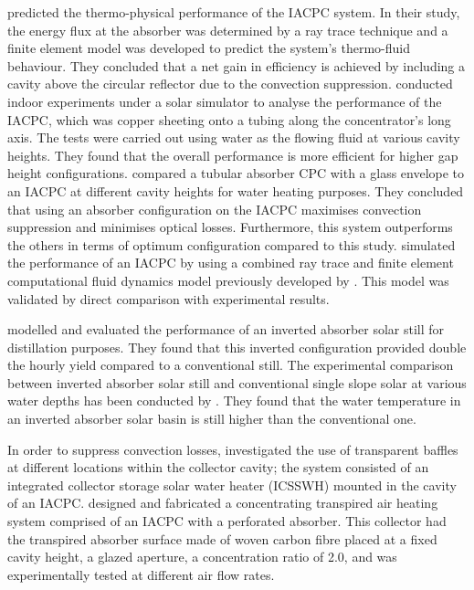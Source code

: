 \citet{Eames1996} predicted the thermo-physical performance of the IACPC system. In their study, the energy flux at the absorber was determined by a ray trace technique and a finite element model was developed to predict the system's thermo-fluid behaviour. They concluded that a net gain in efficiency is achieved by including a cavity above the circular reflector due to the convection suppression.
\citet{Kothdiwala1997} conducted indoor experiments under a solar simulator to analyse the performance of the IACPC, which was copper sheeting onto a tubing along the concentrator's long axis. The tests were carried out using water as the flowing fluid at various cavity heights. They found that the overall performance is more efficient for higher gap height configurations.
\citet{Kothdiwala1999} compared a tubular absorber CPC with a glass envelope to an IACPC at different cavity heights for water heating purposes. They concluded that using an absorber configuration on the IACPC maximises convection suppression and minimises optical losses. Furthermore, this system outperforms the others in terms of optimum configuration compared to this study.
\citet{Eames2001} simulated the performance of an IACPC by using a combined ray trace and finite element computational fluid dynamics model previously developed by \citet{Eames1993a}. This model was validated by direct comparison with experimental results.

\citet{Tiwari1998} modelled and evaluated the performance of an inverted absorber solar still for distillation purposes. They found that this inverted configuration provided double the hourly yield compared to a conventional still. The experimental comparison between inverted absorber solar still and conventional single slope solar at various water depths has been conducted by \citet{Dev2011}. They found that the water temperature in an inverted absorber solar basin is still higher than the conventional one.

In order to suppress convection losses, \citet{Smyth2005} investigated the use of transparent baffles at different locations within the collector cavity; the system consisted of an integrated collector storage solar water heater (ICSSWH) mounted in the cavity of an IACPC. \citet{Shams2016} designed and fabricated a concentrating transpired air heating system comprised of an IACPC with a perforated absorber. This collector had the transpired absorber surface made of woven carbon fibre placed at a fixed cavity height, a glazed aperture, a concentration ratio of 2.0, and was experimentally tested at different air flow rates.

